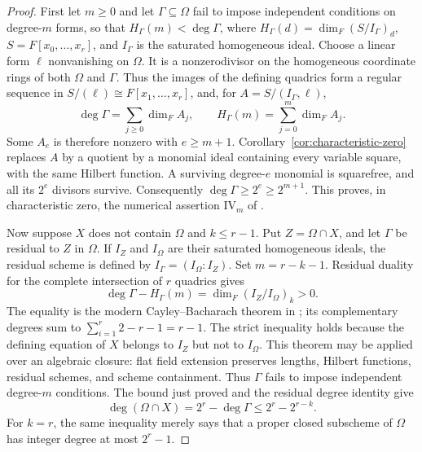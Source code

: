\begin{proof}
First let \(m\ge0\) and let \(\Gamma\subseteq\Omega\) fail to impose
independent conditions on degree-\(m\) forms, so that
\(H_\Gamma(m)<\deg\Gamma\), where
\(H_\Gamma(d)=\dim_F(S/I_\Gamma)_d\),
\(S=F[x_0,\ldots,x_r]\), and \(I_\Gamma\) is the saturated homogeneous
ideal. Choose a linear form \(\ell\) nonvanishing on \(\Omega\). It is a
nonzerodivisor on the homogeneous coordinate rings of both \(\Omega\)
and \(\Gamma\). Thus the images of the defining quadrics form a regular
sequence in \(S/(\ell)\cong F[x_1,\ldots,x_r]\), and, for
\(A=S/(I_\Gamma,\ell)\),
\[
 \deg\Gamma=\sum_{j\ge0}\dim_F A_j,
 \qquad H_\Gamma(m)=\sum_{j=0}^m\dim_F A_j.
\]
Some \(A_e\) is therefore nonzero with \(e\ge m+1\).
Corollary~\ref{cor:characteristic-zero} replaces \(A\) by a quotient by a
monomial ideal containing every variable square, with the same Hilbert
function. A surviving degree-\(e\) monomial is squarefree, and all its
\(2^e\) divisors survive. Consequently
\(\deg\Gamma\ge2^e\ge2^{m+1}\). This proves, in characteristic zero,
the numerical assertion \(\mathrm{IV}_m\) of \cite[Section~3]{EGH93}.

Now suppose \(X\) does not contain \(\Omega\) and \(k\le r-1\).
Put \(Z=\Omega\cap X\), and let \(\Gamma\) be residual to \(Z\) in
\(\Omega\). If \(I_Z\) and \(I_\Omega\) are their saturated homogeneous
ideals, the residual scheme is defined by
\(I_\Gamma=(I_\Omega:I_Z)\). Set \(m=r-k-1\). Residual duality for the
complete intersection of \(r\) quadrics gives
\[
 \deg\Gamma-H_\Gamma(m)
   =\dim_F(I_Z/I_\Omega)_k>0.
\]
The equality is the modern Cayley--Bacharach theorem in
\cite[Section~3, p.~195]{EGH93}; its complementary degrees sum to
\(\sum_{i=1}^r2-r-1=r-1\).
The strict inequality holds because the defining equation of \(X\)
belongs to \(I_Z\) but not to \(I_\Omega\).
This theorem may be applied over an algebraic closure: flat field
extension preserves lengths, Hilbert functions, residual schemes,
and scheme containment. Thus \(\Gamma\) fails to impose independent
degree-\(m\) conditions. The bound just proved and the residual degree
identity give
\[
 \deg(\Omega\cap X)=2^r-\deg\Gamma
 \le 2^r-2^{r-k}.
\]
For \(k=r\), the same inequality merely says that a proper closed
subscheme of \(\Omega\) has integer degree at most \(2^r-1\).
\end{proof}
